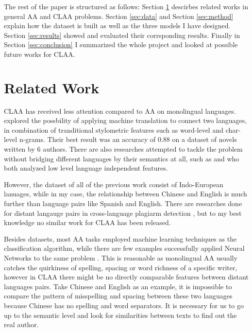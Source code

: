\documentclass[11pt,a4paper]{article}
\begin{document}
The rest of the paper is structured as follows: Section \ref{sec:related-work} descirbes related works in general AA and CLAA problems. Section \ref{sec:data} and Section \ref{sec:method} explain how the dataset is built as well as the three models I have designed. Section \ref{sec:results} showed and evaluated their corrsponding results. Finally in Section \ref{sec:conclusion} I summarized the whole project and looked at possible future works for CLAA.

\section{Related Work}\label{sec:related-work}

CLAA has received less attention compared to AA on monolingual languages. \citet{bogdanova2014cross} explored the possbility of applying machine translation to connect two languages, in combination of tranditional stylometric features such as word-level and char-level n-grams. Their best result was an accuracy of 0.88 on a dataset of novels written by 6 authors. There are also researches attempted to tackle the problem without bridging different languages by their semantics at all, such as \citet{llorens2016deep} and \citet{sarwar2018scalable} who both analyzed low level language independent features.

However, the dataset of all of the previous work consist of Indo-European lanuages, while in my case, the relationship between Chinese and English is much further than language pairs like Spanish and English. There are researches done for distant langauge pairs in cross-language plagiarm detection \cite{barron2010plagiarism}, but to my best knowledge no similar work for CLAA has been released.

Besides datasets, most AA tasks employed machine learning techniques as the classification algorithm, while there are few examples successfully applied Neural Networks to the same problem \cite{shrestha2017convolutional}. This is reasonable as monolingual AA usually catches the quirkiness of spelling, spacing or word richness of a specific writer, however in CLAA there might be no directly comparable features between distant languages pairs. Take Chinese and English as an example, it is impossible to compare the pattern of misspelling and spacing between these two languages because Chinese has no spelling and word separators. It is necessary for us to go up to the semantic level and look for similarities between texts to find out the real author.
\end{document}
